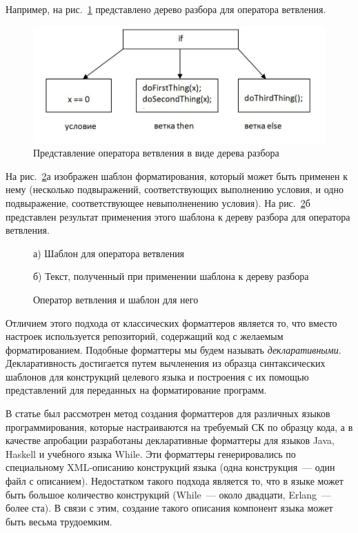 \documentclass[conference]{IEEEtran}
\begin{document}
Например, на рис.~\ref{fig:ifTree} представлено дерево разбора для оператора ветвления. 
\begin{figure}[h]
	\centering
	\includegraphics[width=.5\textwidth]{images/ifTree.jpg}
	\caption{Представление оператора ветвления в виде дерева разбора}
	\label{fig:ifTree}
\end{figure}

На рис.~\ref{fig:tmpltcodeintro}а изображен шаблон форматирования, который может быть применен к нему (несколько подвыражений, соответствующих выполнению условия, и одно подвыражение, соответствующее невыполненению условия).
На рис.~\ref{fig:tmpltcodeintro}б представлен результат применения этого шаблона к дереву разбора для оператора ветвления.

\begin{figure}[ht]
\noindent\begin{minipage}{.2\textwidth}
    
\caption*{а) Шаблон для оператора ветвления}    
\end{minipage}\hfill
\begin{minipage}{.25\textwidth}
    
\caption*{б) Текст, полученный при применении шаблона к дереву разбора}    
\end{minipage}
\caption{Оператор ветвления и шаблон для него}    
\label{fig:tmpltcodeintro}
\end{figure}

Отличием этого подхода от классических форматтеров является то, что вместо настроек используется репозиторий, содержащий код с желаемым форматированием.
Подобные форматтеры мы будем называть \emph{декларативными}.
Декларативность достигается путем вычленения из образца синтаксических шаблонов для конструкций целевого языка и построения с их помощью представлений для переданных на форматирование программ.

В статье был рассмотрен метод создания форматтеров для различных языков программирования, которые настраиваются на требуемый СК по образцу кода, а в качестве апробации разработаны декларативные форматтеры для языков Java, Haskell и учебного языка While.
Эти форматтеры генерировались по специальному XML-описанию конструкций языка (одна конструкция~--- один файл с описанием). 
Недостатком такого подхода является то, что в языке может быть большое количество конструкций (While~--- около двадцати, Erlang~--- более ста).
В связи с этим, создание такого описания компонент языка может быть весьма трудоемким.
\end{document}
